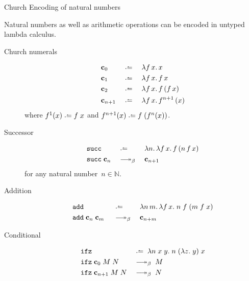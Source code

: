 \begin{frame}[allowframebreaks]{Church Encoding of natural numbers}

  Natural numbers as well as arithmetic operations can be encoded in untyped
  lambda calculus.
  \begin{description}
    \item[Church numerals] 
      \begin{align*}
        &\bc_0 &&\defeq\;&& \lambda f\,x.\, x \\
        &\bc_{1} &&\defeq\;&& \lambda f\,x.\, f\,x \\
        &\bc_{2} &&\defeq\;&& \lambda f\,x.\, f\,(f\,x) \\
        &\bc_{n+1} &&\defeq\;&& \lambda f\,x.\, f^{n+1}\,(x)
      \end{align*}
      where $f^1(x) \defeq f\;x$ and $f^{n+1}(x)  \defeq f\;(f^n(x))$.
    \item[Successor]
      \begin{align*}
        & \mathtt{succ} && \defeq\; && \lambda n.\,\lambda f\,x.\, f\,(n\,f\,x) \\
        & \mathtt{succ}\;\bc_n && \reduce\; && \bc_{n+1}
      \end{align*}
      for any natural number~$n \in \mathbb{N}$.
    \item[Addition]
      \begin{align*}
        & \mathtt{add} && \defeq\; && \lambda n\,m.\,\lambda f\,x.\;
        n\;f\;(m\;f\;x)  \\ & \mathtt{add}\;\bc_{n}\;\bc_{m}\;
                            && \reduce\; && \bc_{n + m}
      \end{align*}

    \item[Conditional]
      \begin{align*}
        & \mathtt{ifz} && \defeq \; \lambda n\;x\;y.\;n\;(\lambda z.\;y)\;x 
        \\
        & \mathtt{ifz}\;\bc_0\;M\;N && \reduce \; M \\
        & \mathtt{ifz}\;\bc_{n+1}\;M\;N && \reduce \; N
      \end{align*}
  \end{description}
\end{frame}

